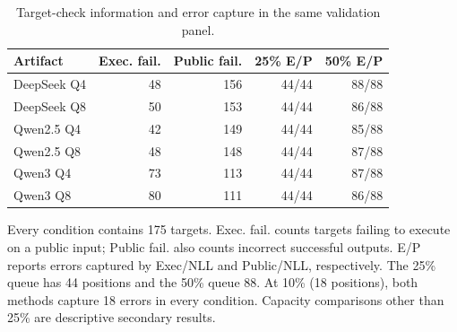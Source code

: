 \begin{table}[htbp]
\centering
\caption{Target-check information and error capture in the same validation panel.}
\label{tab:same-stage-capacity}
\small
\begin{tabular}{lrrrr}
\toprule
Artifact & Exec. fail. & Public fail. & 25\% E/P & 50\% E/P \\
\midrule
DeepSeek Q4 & 48 & 156 & 44/44 & 88/88 \\
DeepSeek Q8 & 50 & 153 & 44/44 & 86/88 \\
Qwen2.5 Q4 & 42 & 149 & 44/44 & 85/88 \\
Qwen2.5 Q8 & 48 & 148 & 44/44 & 87/88 \\
Qwen3 Q4 & 73 & 113 & 44/44 & 87/88 \\
Qwen3 Q8 & 80 & 111 & 44/44 & 86/88 \\
\bottomrule
\end{tabular}
\par\vspace{4pt}\begin{minipage}{0.98\linewidth}\footnotesize Every condition contains 175 targets. Exec. fail. counts targets failing to execute on a public input; Public fail. also counts incorrect successful outputs. E/P reports errors captured by Exec/NLL and Public/NLL, respectively. The 25\% queue has 44 positions and the 50\% queue 88. At 10\% (18 positions), both methods capture 18 errors in every condition. Capacity comparisons other than 25\% are descriptive secondary results.\end{minipage}
\end{table}
